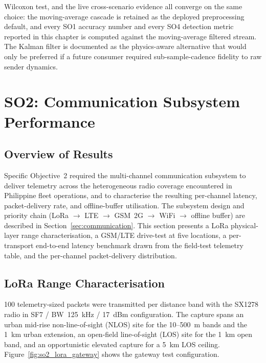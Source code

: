 Wilcoxon test, and the live cross-scenario evidence all converge on the same choice: the moving-average cascade is retained as the deployed preprocessing default, and every SO1 accuracy number and every SO4 detection metric reported in this chapter is computed against the moving-average filtered stream. The Kalman filter is documented as the physics-aware alternative that would only be preferred if a future consumer required sub-sample-cadence fidelity to raw sender dynamics.

\section{SO2: Communication Subsystem Performance}
\label{sec:results_so2}

\subsection{Overview of Results}
Specific Objective~2 required the multi-channel communication subsystem to deliver telemetry across the heterogeneous radio coverage encountered in Philippine fleet operations, and to characterise the resulting per-channel latency, packet-delivery rate, and offline-buffer utilisation. The subsystem design and priority chain (LoRa $\rightarrow$ LTE $\rightarrow$ GSM~2G $\rightarrow$ WiFi $\rightarrow$ offline buffer) are described in Section~\ref{sec:communication}. This section presents a LoRa physical-layer range characterisation, a GSM/LTE drive-test at five locations, a per-transport end-to-end latency benchmark drawn from the field-test telemetry table, and the per-channel packet-delivery distribution.

\subsection{LoRa Range Characterisation}
100 telemetry-sized packets were transmitted per distance band with the SX1278 radio in SF7 / BW~125~kHz / 17~dBm configuration. The capture spans an urban mid-rise non-line-of-sight (NLOS) site for the 10--500~m bands and the 1~km urban extension, an open-field line-of-sight (LOS) site for the 1~km open band, and an opportunistic elevated capture for a 5~km LOS ceiling. Figure~\ref{fig:so2_lora_gateway} shows the gateway test configuration.

